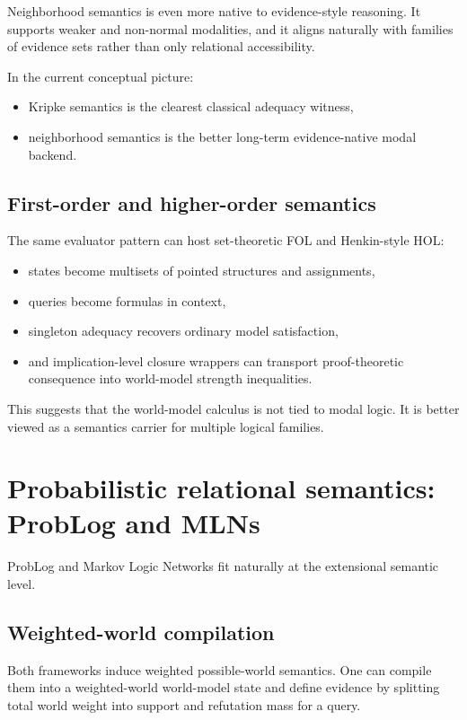\documentclass[11pt]{article}
\begin{document}
Neighborhood semantics is even more native to evidence-style reasoning.  It
supports weaker and non-normal modalities, and it aligns naturally with
families of evidence sets rather than only relational accessibility.

In the current conceptual picture:
\begin{itemize}
  \item Kripke semantics is the clearest classical adequacy witness,
  \item neighborhood semantics is the better long-term evidence-native modal
        backend.
\end{itemize}

\subsection{First-order and higher-order semantics}

The same evaluator pattern can host set-theoretic FOL and Henkin-style HOL:
\begin{itemize}
  \item states become multisets of pointed structures and assignments,
  \item queries become formulas in context,
  \item singleton adequacy recovers ordinary model satisfaction,
  \item and implication-level closure wrappers can transport proof-theoretic
        consequence into world-model strength inequalities.
\end{itemize}

This suggests that the world-model calculus is not tied to modal logic.  It is
better viewed as a semantics carrier for multiple logical families.

\section{Probabilistic relational semantics: ProbLog and MLNs}

ProbLog and Markov Logic Networks fit naturally at the extensional semantic
level.

\subsection{Weighted-world compilation}

Both frameworks induce weighted possible-world semantics.  One can compile them
into a weighted-world world-model state and define evidence by splitting total
world weight into support and refutation mass for a query.
\end{document}
